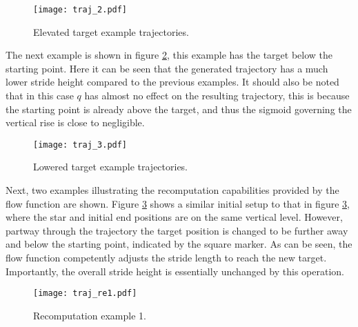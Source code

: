                 \begin{figure}[h]
                    \centering
                    \texttt{[image: traj\_2.pdf]}
                    \caption{Elevated target example trajectories.}
                    \label{fig:traj2}
                \end{figure}
                
                The next example is shown in figure \ref{fig:traj3}, this example has the target below the starting point. Here it can be seen that the generated trajectory has a much lower stride height compared to the previous examples. It should also be noted that in this case \(q\) has almost no effect on the resulting trajectory, this is because the starting point is already above the target, and thus the sigmoid governing the vertical rise is close to negligible.
                \begin{figure}[h]
                    \centering
                    \texttt{[image: traj\_3.pdf]}
                    \caption{Lowered target example trajectories.}
                    \label{fig:traj3}
                \end{figure}

                \noindent
                Next, two examples illustrating the recomputation capabilities provided by the flow function are shown. Figure \ref{fig:traj_re1} shows a similar initial setup to that in figure \ref{fig:traj_re1}, where the star and initial end positions are on the same vertical level. However, partway through the trajectory the target position is changed to be further away and below the starting point, indicated by the square marker. As can be seen, the flow function competently adjusts the stride length to reach the new target. Importantly, the overall stride height is essentially unchanged by this operation.
                \begin{figure}[h]
                    \centering
                    \texttt{[image: traj\_re1.pdf]}
                    \caption{Recomputation example 1.}
                    \label{fig:traj_re1}
                \end{figure}

